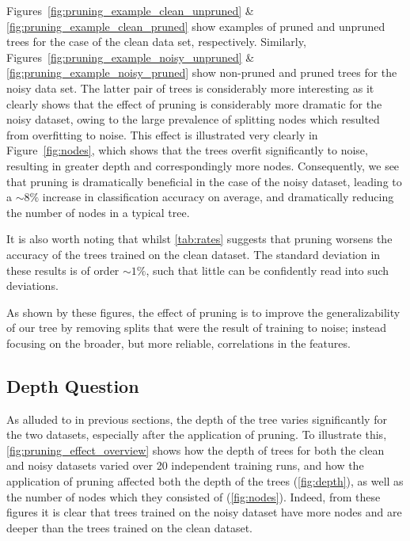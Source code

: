 \documentclass[11pt,twoside]{article}
\begin{document}
Figures~\ref{fig:pruning_example_clean_unpruned} \& \ref{fig:pruning_example_clean_pruned} show examples of pruned and unpruned trees for the case of the clean data set, respectively. Similarly, Figures~\ref{fig:pruning_example_noisy_unpruned} \& \ref{fig:pruning_example_noisy_pruned} show non-pruned and pruned trees for the noisy data set. The latter pair of trees is considerably more interesting as it clearly shows that the effect of pruning is considerably more dramatic for the noisy dataset, owing to the large prevalence of splitting nodes which resulted from overfitting to noise. This effect is illustrated very clearly in  Figure~\ref{fig:nodes}, which shows that the trees overfit significantly to noise, resulting in greater depth and correspondingly more nodes. Consequently, we see that pruning is dramatically beneficial in the case of the noisy dataset, leading to a $\sim8\%$ increase in classification accuracy on average, and dramatically reducing the number of nodes in a typical tree.  

It is also worth noting that whilst \autoref{tab:rates} suggests that pruning worsens the accuracy of the trees trained on the clean dataset. The standard deviation in these results is of order $\sim1\%$, such that little can be confidently read into such deviations.



As shown by these figures, the effect of pruning is to improve the generalizability of our tree by removing splits that were the result of training to noise; instead focusing on the broader, but more reliable, correlations in the features.

\subsection{Depth Question}
\label{sec:depth_question}
As alluded to in previous sections, the depth of the tree varies significantly for the two datasets, especially after the application of pruning. To illustrate this, \autoref{fig:pruning_effect_overview} shows how the depth of trees for both the clean and noisy datasets varied over 20 independent training runs, and how the application of pruning affected both the depth of the trees  (\autoref{fig:depth}), as well as the number of nodes which they consisted of (\autoref{fig:nodes}). Indeed, from these figures it is clear that trees trained on the noisy dataset have more nodes and are deeper than the trees trained on the clean dataset. 
\end{document}
